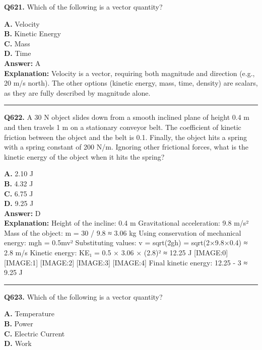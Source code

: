 \documentclass[12pt]{article}
\begin{document}
\noindent
\textbf{Q621.} Which of the following is a vector quantity?



\textbf{A.} Velocity \\
\textbf{B.} Kinetic Energy \\
\textbf{C.} Mass \\
\textbf{D.} Time \\

\textbf{Answer:} A \\
\textbf{Explanation:} Velocity is a vector, requiring both magnitude and direction (e.g., 20 m/s north). The other options (kinetic energy, mass, time, density) are scalars, as they are fully described by magnitude alone.

\hrule
\vspace{1em}


\noindent
\textbf{Q622.} A 30 N object slides down from a smooth inclined plane of height 0.4 m and then travels 1 m on a stationary conveyor belt. The coefficient of kinetic friction between the object and the belt is 0.1. Finally, the object hits a spring with a spring constant of 200 N/m. Ignoring other frictional forces, what is the kinetic energy of the object when it hits the spring?



\textbf{A.} 2.10 J \\
\textbf{B.} 4.32 J \\
\textbf{C.} 6.75 J \\
\textbf{D.} 9.25 J \\

\textbf{Answer:} D \\
\textbf{Explanation:} Height of the incline: 0.4 m
Gravitational acceleration: 9.8 m/s²
Mass of the object: m = 30 / 9.8 ≈ 3.06 kg
Using conservation of mechanical energy: mgh = 0.5mv²
Substituting values: v = sqrt(2gh) = sqrt(2×9.8×0.4) ≈ 2.8 m/s
Kinetic energy: KE₁ = 0.5 × 3.06 × (2.8)² ≈ 12.25 J
[IMAGE:0]
[IMAGE:1]
[IMAGE:2]
[IMAGE:3]
[IMAGE:4]
Final kinetic energy: 12.25 - 3 ≈ 9.25 J

\hrule
\vspace{1em}


\noindent
\textbf{Q623.} Which of the following is a vector quantity?



\textbf{A.} Temperature \\
\textbf{B.} Power \\
\textbf{C.} Electric Current \\
\textbf{D.} Work \\
\end{document}
